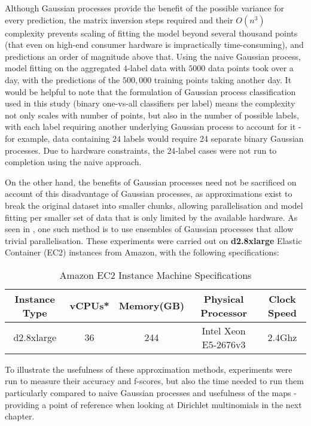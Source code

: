 Although Gaussian processes provide the benefit of the possible variance for every prediction, the matrix inversion steps required and their $O(n^3)$ complexity prevents scaling of fitting the model beyond several thousand points (that even on high-end consumer hardware is impractically time-consuming), and predictions an order of magnitude above that. Using the naive Gaussian process, model fitting on the aggregated $4$-label data with $5000$ data points took over a day, with the predictions of the $500,000$ training points taking another day. It would be helpful to note that the formulation of Gaussian process classification used in this study (binary one-vs-all classifiers per label) means the complexity not only scales with number of points, but also in the number of possible labels, with each label requiring another underlying Gaussian process to account for it - for example, data containing $24$ labels would require 24 separate binary Gaussian processes. Due to hardware constraints, the $24$-label cases were not run to completion using the naive approach.

On the other hand, the benefits of Gaussian processes need not be sacrificed on account of this disadvantage of Gaussian processes, as approximations exist to break the original dataset into smaller chunks, allowing parallelisation and model fitting per smaller set of data that is only limited by the available hardware. As seen in , one such method is to use ensembles of Gaussian processes that allow trivial parallelisation. These experiments were carried out on \textbf{d2.8xlarge} Elastic Container (EC2) instances from Amazon, with the following specifications:

\begin{table}[H]
    \centering
    \begin{tabular}{|c|c|c|c|c|}
        \hline
        Instance Type & vCPUs* & Memory(GB) & Physical Processor & Clock Speed \\\hline
        d2.8xlarge & 36 & 244 & Intel Xeon E5-2676v3 & 2.4Ghz\\\hline
    \end{tabular}
    \label{table:ec2specs}
    \caption{Amazon EC2 Instance Machine Specifications}
\end{table}

To illustrate the usefulness of these approximation methods, experiments were run to measure their accuracy and f-scores, but also the time needed to run them particularly compared to naive Gaussian processes and usefulness of the maps - providing a point of reference when looking at Dirichlet multinomials in the next chapter.

